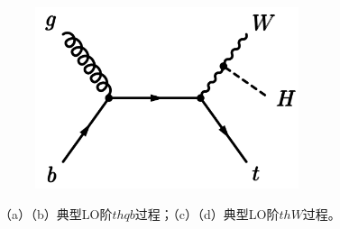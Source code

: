\begin{figure}[h]
\begin{subfigure}[b]{0.33\textwidth}
  \caption{}
  \label{fig:diagram_ggzh1}
 \end{subfigure}
 \begin{subfigure}[b]{0.33\textwidth}
  \includegraphics[width=0.85\textwidth]{fig/diagram_thW2.png}
  \caption{}
  \label{fig:diagram_ggzh1}
 \end{subfigure}
\caption{（a）（b）典型LO阶$thqb$过程；（c）（d）典型LO阶$thW$过程。}
\label{fig:diagram_th}
\end{figure}

